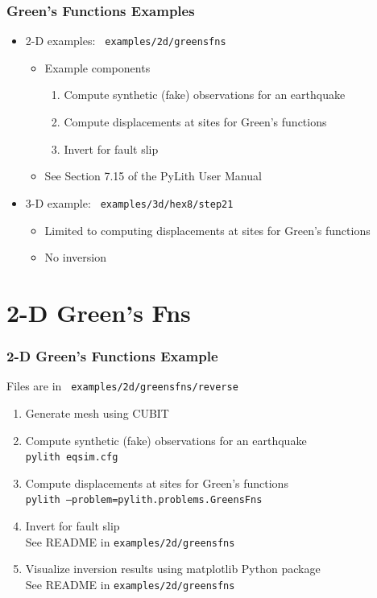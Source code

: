 \documentclass{beamer}
\begin{document}
\begin{frame}
  \frametitle{Green's Functions Examples}
  \summary{}

  \begin{itemize}
  \item 2-D examples: {\tt\color{red} examples/2d/greensfns}
    \begin{itemize}
    \item Example components
      \begin{enumerate}
      \item Compute synthetic (fake) observations for an earthquake
      \item Compute displacements at sites for Green's functions
      \item Invert for fault slip
      \end{enumerate}
    \item See Section 7.15 of the PyLith User Manual
    \end{itemize}
  \item 3-D example: {\tt\color{red} examples/3d/hex8/step21}
    \begin{itemize}
    \item Limited to computing displacements at sites for Green's functions
    \item No inversion
    \end{itemize}
  \end{itemize}
  
\end{frame}


\section{2-D Green's Fns}

\begin{frame}
  \frametitle{2-D Green's Functions Example}

  \vfill
  Files are in {\tt\color{red} examples/2d/greensfns/reverse}
  \vfill

  \begin{enumerate}
  \item Generate mesh using CUBIT
  \item Compute synthetic (fake) observations for an earthquake\\
    {\tt pylith eqsim.cfg}
  \item Compute displacements at sites for Green's functions\\
    {\tt pylith --problem=pylith.problems.GreensFns}
  \item Invert for fault slip\\
    See README in {\tt examples/2d/greensfns}
  \item Visualize inversion results using matplotlib Python package\\
    See README in {\tt examples/2d/greensfns}
  \end{enumerate}
  
\end{frame}
\end{document}
